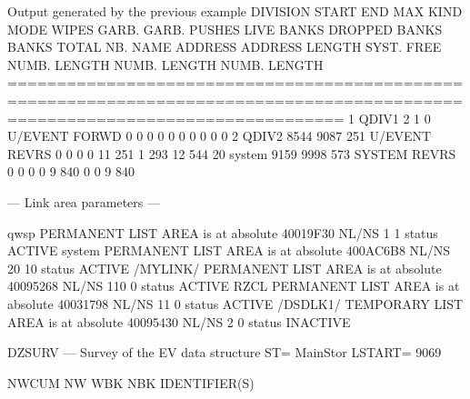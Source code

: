 \begin{Listing}{Output generated by the previous example}
   DIVISION    START    END       MAX    KIND   MODE  WIPES  GARB.  GARB. PUSHES      LIVE BANKS  DROPPED BANKS    BANKS TOTAL   
 NB.   NAME   ADDRESS ADDRESS  LENGTH                        SYST.   FREE         NUMB.   LENGTH NUMB.   LENGTH NUMB.   LENGTH   
==============================================================================================================================   
  1  QDIV1          2       1       0 U/EVENT  FORWD      0      0      0      0       0        0     0        0     0        0  
  2  QDIV2       8544    9087     251 U/EVENT  REVRS      0      0      0      0      11      251     1      293    12      544  
 20  system      9159    9998     573  SYSTEM  REVRS      0      0      0      0       9      840     0        0     9      840  
                                                                                                                                 
 --- Link area parameters ---                                                                                                    
                                                                                                                                 
qwsp     PERMANENT LIST AREA      is at absolute 40019F30 NL/NS     1    1     status   ACTIVE                                   
system   PERMANENT LIST AREA      is at absolute 400AC6B8 NL/NS    20   10     status   ACTIVE                                   
/MYLINK/ PERMANENT LIST AREA      is at absolute 40095268 NL/NS   110    0     status   ACTIVE                                   
RZCL     PERMANENT LIST AREA      is at absolute 40031798 NL/NS    11    0     status   ACTIVE                                   
/DSDLK1/ TEMPORARY LIST AREA      is at absolute 40095430 NL/NS     2    0     status INACTIVE                                   
                                                                                                                                 
DZSURV --- Survey of the EV data structure                                                         ST= MainStor  LSTART=     9069
                                                                                                                                 
  NWCUM     NW   WBK  NBK    IDENTIFIER(S)                                                                                       
                                                                                                                                 

\end{Listing}
